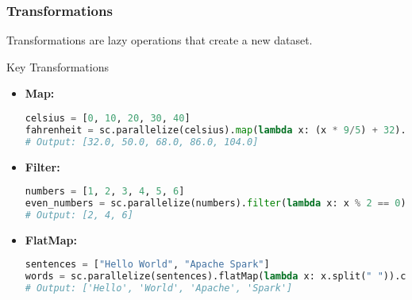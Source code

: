 \documentclass[aspectratio=169]{beamer}
\begin{document}
\begin{frame}[fragile]
    \frametitle{Transformations}
    Transformations are lazy operations that create a new dataset.
    
    \begin{block}{Key Transformations}
        \begin{itemize}
            \item \textbf{Map:}
            \begin{lstlisting}[language=Python]
celsius = [0, 10, 20, 30, 40]
fahrenheit = sc.parallelize(celsius).map(lambda x: (x * 9/5) + 32).collect()
# Output: [32.0, 50.0, 68.0, 86.0, 104.0]
            \end{lstlisting}

            \item \textbf{Filter:}
            \begin{lstlisting}[language=Python]
numbers = [1, 2, 3, 4, 5, 6]
even_numbers = sc.parallelize(numbers).filter(lambda x: x % 2 == 0).collect()
# Output: [2, 4, 6]
            \end{lstlisting}

            \item \textbf{FlatMap:}
            \begin{lstlisting}[language=Python]
sentences = ["Hello World", "Apache Spark"]
words = sc.parallelize(sentences).flatMap(lambda x: x.split(" ")).collect()
# Output: ['Hello', 'World', 'Apache', 'Spark']
            \end{lstlisting}
        \end{itemize}
    \end{block}
\end{frame}
\end{document}
